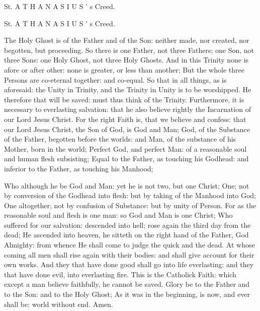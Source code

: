 St. A T H A N A S I U S ’ s Creed.

St. A T H A N A S I U S ’ s Creed.

The Holy Ghost is of the Father and of the Son: neither made, nor created, nor begotten, but proceeding. So there is one Father, not three Fathers; one Son, not three Sons: one Holy Ghost, not three Holy Ghosts. And in this Trinity none is afore or after other: none is greater, or less than another; But the whole three Persons are co-eternal together: and co-equal. So that in all things, as is aforesaid: the Unity in Trinity, and the Trinity in Unity is to be worshipped. He therefore that will be saved: must thus think of the Trinity. Furthermore, it is necessary to everlasting salvation: that he also believe rightly the Incarnation of our Lord Jesus Christ. For the right Faith is, that we believe and confess: that our Lord Jesus Christ, the Son of God, is God and Man; God, of the Substance of the Father, begotten before the worlds: and Man, of the substance of his Mother, born in the world; Perfect God, and perfect Man: of a reasonable soul and human flesh subsisting; Equal to the Father, as touching his Godhead: and inferior to the Father, as touching his Manhood;

Who although he be God and Man: yet he is not two, but one Christ; One; not by conversion of the Godhead into flesh: but by taking of the Manhood into God; One altogether; not by confusion of Substance: but by unity of Person. For as the reasonable soul and flesh is one man: so God and Man is one Christ; Who suffered for our salvation: descended into hell; rose again the third day from the dead; He ascended into heaven, he sitteth on the right hand of the Father, God Almighty: from whence He shall come to judge the quick and the dead. At whose coming all men shall rise again with their bodies: and shall give account for their own works. And they that have done good shall go into life everlasting: and they that have done evil, into everlasting fire. This is the Catholick Faith: which except a man believe faithfully, he cannot be saved. Glory be to the Father and to the Son: and to the Holy Ghost; As it was in the beginning, is now, and ever shall be: world without end. Amen.



